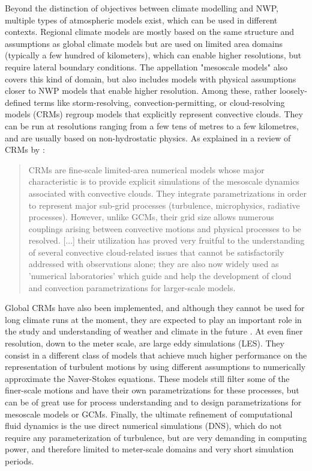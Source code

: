 Beyond the distinction of objectives between climate modelling and NWP, multiple types of atmospheric models exist, which can be used in different contexts.
Regional climate models are mostly based on the same structure and assumptions as global climate models but are used on limited area domains (typically a few hundred of kilometers), which can enable higher resolutions, but require lateral boundary conditions.
The appellation "mesoscale models" also covers this kind of domain, but also includes models with physical assumptions closer to NWP models that enable higher resolution.
Among these, rather loosely-defined terms like storm-resolving, convection-permitting, or cloud-resolving models (CRMs) regroup models that explicitly represent convective clouds. They can be run at resolutions ranging from a few tens of metres to a few kilometres, and are usually based on non-hydrostatic physics.
As explained in a review of CRMs by \citet{guichard_short_2017}:
\begin{quote}
    CRMs are fine-scale limited-area numerical models whose major characteristic is to provide explicit simulations of the mesoscale dynamics associated with convective clouds. They integrate parametrizations in order to represent major sub-grid processes (turbulence, microphysics, radiative processes). However, unlike GCMs, their grid size allows numerous couplings arising between convective motions and physical processes to be resolved. [...] their utilization has proved very fruitful to the understanding of several convective cloud-related issues that cannot be satisfactorily addressed with observations alone; they are also now widely used as 'numerical laboratories' which guide and help the development of cloud and convection parametrizations for larger-scale models.
\end{quote}
Global CRMs have also been implemented, and although they cannot be used for long climate runs at the moment, they are expected to play an important role in the study and understanding of weather and climate in the future \citep{satoh_global_2019}.
At even finer resolution, down to the meter scale, are large eddy simulations (LES). They consist in a different class of models that achieve much higher performance on the representation of turbulent motions by using different assumptions to numerically approximate the Naver-Stokes equations. These models still filter some of the finer-scale motions and have their own parametrizations for these processes, but can be of great use for process understanding and to design parametrizations for mesoscale models or GCMs. 
Finally, the ultimate refinement of computational fluid dynamics is the use direct numerical simulations (DNS), which do not require any parameterization of turbulence, but are very demanding in computing power, and therefore limited to meter-scale domains and very short simulation periods.

